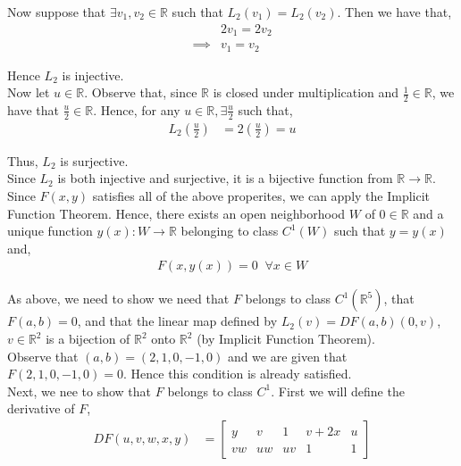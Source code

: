 \documentclass[12pt]{article}
\newenvironment{problem}[2][Problem]{\begin{trivlist}
\item[\hskip \labelsep {\bfseries #1}\hskip \labelsep {\bfseries #2.}]}{\end{trivlist}}
\begin{document}
Now suppose that $\exists v_1, v_2 \in \mathbb{R}$ such that $L_2(v_1) = L_2(v_2)$. Then we have that,
\begin{align*}
&2v_1 = 2v_2\\
\implies &v_1 = v_2
\end{align*}

Hence $L_2$ is injective.\\

Now let $u \in \mathbb{R}$. Observe that, since $\mathbb{R}$ is closed under multiplication and $\frac{1}{2} \in \mathbb{R}$, we have that $\frac{u}{2} \in \mathbb{R}$. Hence, for any $u \in \mathbb{R}, \exists \frac{u}{2}$ such that,
\begin{align*}
L_2\left(\frac{u}{2}\right) &= 2\left(\frac{u}{2}\right) = u
\end{align*}

Thus, $L_2$ is surjective.\\

Since $L_2$ is both injective and surjective, it is a bijective function from $\mathbb{R} \to \mathbb{R}$.\\

Since $F(x, y)$ satisfies all of the above properites, we can apply the Implicit Function Theorem. Hence, there exists an open neighborhood $W$ of $0 \in \mathbb{R}$ and a unique function $y(x): W \to \mathbb{R}$ belonging to class $C^1(W)$ such that $y = y(x)$ and,
\begin{align*}
F(x, y(x)) = 0 \;\; \forall x \in W
\end{align*}

\begin{problem}{2}
\end{problem}

As above, we need to show  we need that $F$ belongs to class $C^1(\mathbb{R}^5)$, that $F(a, b) = 0$, and that the linear map defined by $L_2(v) = DF(a, b)(0, v)$, $v \in \mathbb{R}^2$ is a bijection of $\mathbb{R}^2$ onto $\mathbb{R}^2$ (by Implicit Function Theorem).\\

Observe that $(a, b) = (2, 1, 0, -1, 0)$ and we are given that $F(2, 1, 0, -1, 0) = 0$. Hence this condition is already satisfied.\\

Next, we nee to show that $F$ belongs to class $C^1$. First we will define the derivative of $F$,
\begin{align*}
DF(u, v, w, x, y) &= \begin{bmatrix}
y & v & 1 & v + 2x & u\\
vw & uw & uv & 1 & 1
\end{bmatrix}
\end{align*}
\end{document}
